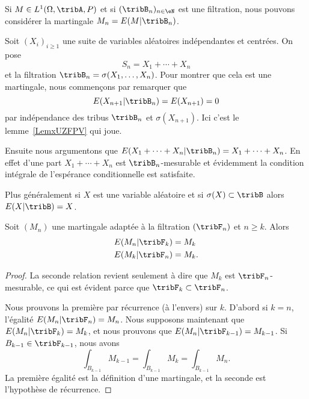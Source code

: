 \begin{example}
	Si \( M\in L^1(\Omega,\tribA,P)\) et si \( (\tribB_n)_{n\in \eN}\) est une filtration, nous pouvons considérer la martingale \( M_n=E(M|\tribB_n)\).
\end{example}

\begin{example}     \label{ExtFFKTr}
	Soit \( (X_i)_{i\geq 1}\) une suite de variables aléatoires indépendantes et centrées. On pose
	\begin{equation}
		S_n=X_1+\cdots +X_n
	\end{equation}
	et la filtration \( \tribB_n=\sigma(X_1,\ldots, X_n)\). Pour montrer que cela est une martingale, nous commençons par remarquer que
	\begin{equation}
		E(X_{n+1}|\tribB_n)=E(X_{n+1})=0
	\end{equation}
	par indépendance des tribus \( \tribB_n\) et \( \sigma(X_{n+1})\). Ici c'est le lemme~\ref{LemxUZFPV} qui joue.

	Ensuite nous argumentons que \( E(X_1+\cdots +X_n|\tribB_n)=X_1+\cdots +X_n\). En effet d'une part \( X_1+\cdots +X_n\) est \( \tribB_n\)-mesurable et évidemment la condition intégrale de l'espérance conditionnelle est satisfaite.

	Plus généralement si \( X\) est une variable aléatoire et si \( \sigma(X)\subset\tribB\) alors \( E(X|\tribB)=X\).
\end{example}

\begin{lemma}   \label{LemqanhgJ}
	Soit \( (M_n)\) une martingale adaptée à la filtration \( (\tribF_n)\) et \( n\geq k\). Alors
	\begin{subequations}
		\begin{align}
			E(M_n|\tribF_k) & =M_k  \\
			E(M_k|\tribF_n) & =M_k.
		\end{align}
	\end{subequations}
\end{lemma}

\begin{proof}
	La seconde relation revient seulement à dire que \( M_k\) est \( \tribF_n\)-mesurable, ce qui est évident parce que \( \tribF_k\subset\tribF_n\).

	Nous prouvons la première par récurrence (à l'envers) sur \( k\). D'abord si \( k=n\), l'égalité \( E(M_n|\tribF_n)=M_n\). Nous supposons maintenant que \( E(M_n|\tribF_k)=M_k\), et nous prouvons que \( E(M_n|\tribF_{k-1})=M_{k-1}\). Si \( B_{k-1}\in \tribF_{k-1}\), nous avons
	\begin{equation}
		\int_{B_{k-1}}M_{k-1}=\int_{B_{k-1}}M_{k}=\int_{B_{k-1}}M_n.
	\end{equation}
	La première égalité est la définition d'une martingale, et la seconde est l'hypothèse de récurrence.
\end{proof}

